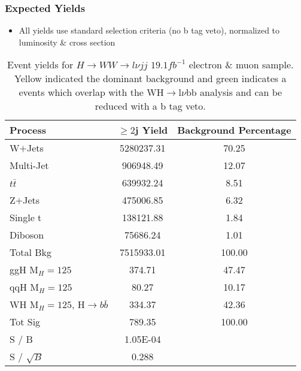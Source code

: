 \begin{frame}
	\frametitle{Expected Yields}
	\vspace*{-0.24cm}
	\begin{alertblock}{}
		\begin{itemize}
			\small
			\item All yields use standard selection criteria (no b tag veto), normalized to luminosity \& cross section
		\end{itemize}
	\end{alertblock}
	\vspace*{-0.2cm}
	\begin{table}[hbtp]
		\centering
		\small
		\begin{tabular}{| l | c | c |}
		\hline\hline
		Process & $\geqslant2$j Yield & Background Percentage \\
		\hline
		W$+$Jets & 5280237.31 & \cellcolor{yellow}70.25 \\
		Multi-Jet   & 906948.49 & 12.07 \\
		$t\bar{t}$  & 639932.24 & 8.51 \\
		Z$+$Jets  & 475006.85 & 6.32 \\
		Single t     & 138121.88 & 1.84 \\
		Diboson    & 75686.24 & 1.01 \\
		\hline
		Total Bkg  & 7515933.01 & 100.00 \\
		\hline\hline
		ggH M$_{H}=125$ & 374.71 & 47.47 \\
		qqH M$_{H}=125$ & 80.27 & 10.17 \\
		WH M$_{H}=125$, H${\rightarrow}b\bar{b}$ & 334.37 & \cellcolor{green}42.36 \\
		\hline
		Tot Sig & 789.35 & 100.00 \\
		\hline\hline
		S / B & 1.05E-04 &  \\
		S / $\sqrt{B}$ & 0.288 &  \\
		\hline
		\end{tabular}
		\caption{\footnotesize{Event yields for $H{\rightarrow}WW{\rightarrow}l{\nu}jj$ $19.1\unit{fb^{-1}}$ electron \& muon sample. Yellow indicated the dominant background and green indicates a events which overlap with the WH$\rightarrow$l$\nu$bb analysis and can be reduced with a b tag veto.}}
		\label{tab:yields}
		\end{table}
\end{frame}

